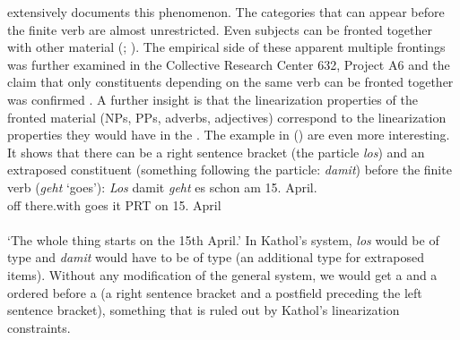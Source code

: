 \documentclass[output=paper]{langsci/langscibook}
\begin{document}
\zl
\citet{Mueller2003b} extensively documents this phenomenon. The categories that can appear
before the finite verb are almost unrestricted. Even subjects can be fronted together with other
material (\citealp[]{BC2010a}; \citealp[]{Bildhauer2011a}). The empirical side of
these apparent multiple frontings was further examined in the Collective Research Center 632,
Project A6 and the claim that only constituents depending on the same verb can be fronted together
\parencites{Fanselow93a}[]{Hoberg97a} was confirmed \citep[Chapter~3]{MuellerGS}. A further insight is that
the linearization properties of the fronted material (NPs, PPs, adverbs, adjectives) correspond to the linearization properties they
would have in the \mf. The example in () are even more interesting. It shows that there can
be a right sentence bracket (the particle \emph{los}) and an extraposed constituent (something
following the particle: \emph{damit}) before the finite verb (\emph{geht} `goes'):
\ea
\label{ex-los-damit-zwei} 
\glll \emph{Los} damit \emph{geht} es schon am 15. April.\footnotemark\\
      off there.with goes it PRT on 15. April\\
             {}  {}\\
\glt `The whole thing starts on the 15th April.'
\z
In Kathol's system, \emph{los} would be of type  and \emph{damit} would have to be of type
 (an additional type for extraposed items). Without any modification of the general system,
we would get a  and a  ordered before a  (a right sentence bracket and a
postfield preceding the left sentence bracket), something that is ruled out by Kathol's linearization constraints. 
\end{document}

